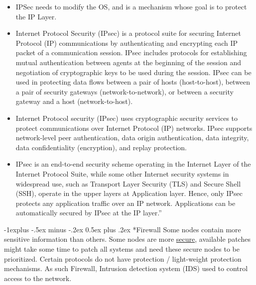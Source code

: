 \documentclass[10pt,landscape]{article}
\makeatletter
\renewcommand{\subsection}{\@startsection{subsection}{2}{0mm}%
                                {-1explus -.5ex minus -.2ex}%
                                {0.5ex plus .2ex}%
                                {\normalfont\normalsize\bfseries}}
\makeatother
\begin{document}
\begin{multicols*}{3}
\begin{itemize}[noitemsep,wide=0pt, leftmargin=\dimexpr{} + 2\relax]
    \item IPSec needs to modify the OS, and is a mechanism whose goal is to protect the IP Layer.
    \item Internet Protocol Security (IPsec) is a protocol suite for securing Internet Protocol (IP)
    communications by authenticating and encrypting each IP packet of a communication
    session. IPsec includes protocols for establishing mutual authentication between agents at
    the beginning of the session and negotiation of cryptographic keys to be used during the
    session. IPsec can be used in protecting data flows between a pair of hosts (host-to-host),
    between a pair of security gateways (network-to-network), or between a security gateway
    and a host (network-to-host).
    \item Internet Protocol security (IPsec) uses cryptographic security services to protect
    communications over Internet Protocol (IP) networks. IPsec supports network-level peer
    authentication, data origin authentication, data integrity, data confidentiality (encryption),
    and replay protection.
    \item IPsec is an end-to-end security scheme operating in the Internet Layer of the Internet
    Protocol Suite, while some other Internet security systems in widespread use, such as
    Transport Layer Security (TLS) and Secure Shell (SSH), operate in the upper layers at
    Application layer. Hence, only IPsec protects any application traffic over an IP network.
    Applications can be automatically secured by IPsec at the IP layer.”
\end{itemize}

\subsection*{Firewall}
Some nodes contain more sensitive information than others. Some nodes are more \underline{secure}, available patches might take some time to 
patch all systems and need these secure nodes to be prioritized. Certain protocols do not have protection / light-weight protection mechanisms.
As such Firewall, Intrusion detection system (IDS) used to control access to the network.


\end{multicols*}
\end{document}
